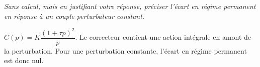 \question{\label{q_31}}\textit{Sans calcul, mais en justifiant votre réponse, préciser l’écart en régime permanent en réponse à un couple
perturbateur constant.}
\ifprof
\begin{corrige}
$C(p)=K\dfrac{\left(1+\tau p\right)^2}{p}$. Le correcteur contient une action intégrale en amont de la perturbation. Pour une perturbation constante, l'écart en régime permanent est donc nul.
\end{corrige}
\else
\fi
%
%
%
%
%
%
%
%
%
